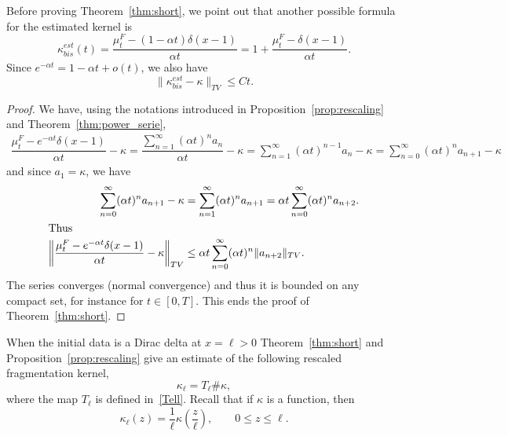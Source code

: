 \documentclass[AHL,Unicode,longabstracts,published]{cedram}
\renewcommand*\a{\alpha}
\begin{document}
Before proving Theorem~\ref{thm:short}, we point out that another possible formula for the estimated kernel is
\begin{equation*}
\kappa^{est}_{bis}(t)= \dfrac{\mu_t^{F} - (1-\alpha t)\delta(x-1) }{\a t}= 1 +\dfrac{\mu_t^{F} - \delta(x-1) }{\a t}.
\end{equation*}
Since $e^{-\alpha t} =1 - \alpha t +o(t)$, we also have
\begin{equation*}
\Big\|\kappa_{bis}^{est}-\kappa\Big\|_{TV} \leq C t.
\end{equation*}
\begin{proof}
We have, using the notations introduced in Proposition~\ref{prop:rescaling} and Theorem~\ref{thm:power_serie},
\begin{equation*}
\begin{aligned}
\dfrac{\mu_t^{F} -e^{-\a t} \delta(x-1)}{\a t} -\kappa = \dfrac{\sum\limits_{n=1}^{\infty} (\a t)^{n} a_n }{\a t}- \kappa = \sum\limits_{n=1}^{\infty} (\a t)^{n-1} a_{n} -\kappa = \sum\limits_{n=0}^{\infty} (\a t)^n a_{n+1} -\kappa
\end{aligned}
\end{equation*}
and since $a_1= \kappa$, we have
\begin{align*}
\sum\limits_{n=0}^{\infty} (\a t)^n a_{n+1} -\kappa &= \sum\limits_{n=1}^{\infty} (\a t)^n a_{n+1} =
\a t \sum\limits_{n=0}^{\infty} (\a t)^n a_{n+2}.\\
\intertext{Thus}
\left\| \dfrac{\mu_t^{F} -e^{-\a t} \delta(x-1)}{\a t} -\kappa \right\|_{TV}
&\leq \a t \sum\limits_{n=0}^{\infty}(\a t)^n \|a_{n+2}\|_{TV}.
\end{align*}
The series converges (normal convergence) and thus it is bounded on any compact set, for instance for $t\in [0,T]$. This ends the proof of Theorem~\ref{thm:short}.
\end{proof}
When the initial data is a Dirac delta at $x=\ell>0$ Theorem~\ref{thm:short} and Proposition~\ref{prop:rescaling} give an estimate of the following rescaled fragmentation kernel,
\begin{equation*}
\kappa_{\ell} = T_{\ell} \#\kappa,
\end{equation*}
where the map $T_{\ell}$ is defined in~\eqref{Tell}. Recall that if $\kappa$ is a function, then
\begin{equation*}
\kappa_{\ell} (z) = \dfrac{1}{\ell}\kappa\left(\dfrac{z}{\ell}\right), \qquad 0\leq z\leq \ell.
\end{equation*}
\end{document}
